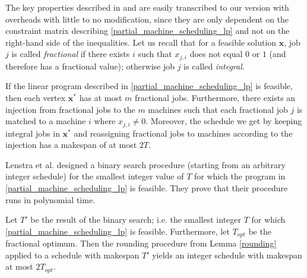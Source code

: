 \documentclass[a4paper,UKenglish,cleveref, autoref, thm-restate, pdfa]{lipics-v2021}
\theoremstyle{plain}
\begin{document}
The key properties described in \cite{lenstra_shmoys_tardos} and \cite{vazirani} are easily transcribed to our version with overheads with little to no modification, since they are only dependent on the constraint matrix describing \eqref{partial_machine_scheduling_lp} and not on the right-hand side of the inequalities. Let us recall that for a feasible solution $\bm{x}$, job $j$ is called \emph{fractional} if there exists $i$ such that $x_{j,i}$ does not equal $0$ or $1$ (and therefore has a fractional value); otherwise job $j$ is called \emph{integral}.

\begin{lmm}\label{rounding}
    If the linear program described in \eqref{partial_machine_scheduling_lp} is feasible, then each vertex $\bm{x}^*$ has at most $m$ fractional jobs. Furthermore, there exists an injection from fractional jobs to the $m$ machines such that each fractional job $j$ is matched to a machine $i$ where $x_{j,i}\ne 0$. Moreover, the schedule we get by keeping integral jobs in $\bm{x}^*$ and reassigning fractional jobs to machines according to the injection has a makespan of at most $2T$.
\end{lmm}

Lenstra et al. designed a binary search procedure (starting from an arbitrary integer schedule) for the smallest integer value of $T$ for which the program in \eqref{partial_machine_scheduling_lp} is feasible. They prove that their procedure runs in polynomial time.

\begin{prop}\label{2_approx_machine}
    Let $T'$ be the result of the binary search; i.e. the smallest integer $T$ for which \eqref{partial_machine_scheduling_lp} is feasible. Furthermore, let $T_{opt}$ be the fractional optimum. Then the rounding procedure from Lemma \ref{rounding} applied to a schedule with makespan $T'$ yields an integer schedule with makespan at most $2T_{opt}$.
\end{prop}
\end{document}
